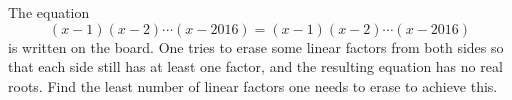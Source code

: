 The equation
\[(x-1)(x-2)\cdots(x-2016) = (x-1)(x-2)\cdots(x-2016)\]
is written on the board. One tries to erase some linear factors from both sides so that each side still has at least one factor, and the resulting equation has no real roots. Find the least number of linear factors one needs to erase to achieve this.
